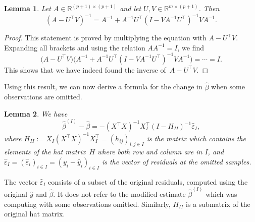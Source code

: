 \documentclass[
  a4paper,
]{article}
\newtheorem{lemma}{Lemma}[section]
\theoremstyle{definition}
\theoremstyle{definition}
\theoremstyle{definition}
\theoremstyle{definition}
\theoremstyle{remark}
\begin{document}
\begin{lemma}
\protect\hypertarget{lem:low-rank-inverse}{}\label{lem:low-rank-inverse}Let \(A \in \mathbb{R}^{(p+1)\times (p+1)}\) and let \(U, V \in \mathbb{R}^{m \times (p+1)}\).
Then
\begin{equation*}
  (A - U^\top V)^{-1}
  = A^{-1} + A^{-1} U^\top (I - V A^{-1} U^\top)^{-1} V A^{-1}.
\end{equation*}
\end{lemma}

\begin{proof}
This statement is proved by multiplying the equation with \(A - U^\top V\).
Expanding all brackets and using the relation \(A A^{-1} = I\), we find
\begin{equation*}
  \bigl( A - U^\top V \bigr)
    \bigl( A^{-1} + A^{-1} U^\top (I - V A^{-1} U^\top)^{-1} V A^{-1} \bigr)
  = \cdots
  = I.
\end{equation*}
This shows that we have indeed found the inverse of~\(A - U^\top V\).
\end{proof}

Using this result, we can now derive a formula for the change in \(\hat\beta\)
when some observations are omitted.

\begin{lemma}
\protect\hypertarget{lem:hat-beta-I}{}\label{lem:hat-beta-I}We have
\begin{equation*}
  \hat\beta^{(I)} - \hat\beta
  = - (X^\top X)^{-1} X_I^\top (I - H_{II})^{-1} \hat\varepsilon_I,
\end{equation*}
where \(H_{II} := X_I (X^\top X)^{-1} X_I^\top = (h_{ij})_{i,j\in I}\) is the
matrix which contains the elements of the hat matrix~\(H\) where both row and
column are in \(I\), and \(\hat\varepsilon_I = (\hat\varepsilon_i)_{i\in I} = (y_i - \hat y_i)_{i\in I}\) is the vector of residuals at the omitted samples.
\end{lemma}

The vector \(\hat\varepsilon_I\) consists of a subset of the original
residuals, computed using the original \(\hat y\) and \(\hat\beta\). It does not
refer to the modified estimate \(\hat\beta^{(I)}\) which was computing with some
observations omitted. Similarly, \(H_{II}\) is a submatrix of the original
hat matrix.
\end{document}
